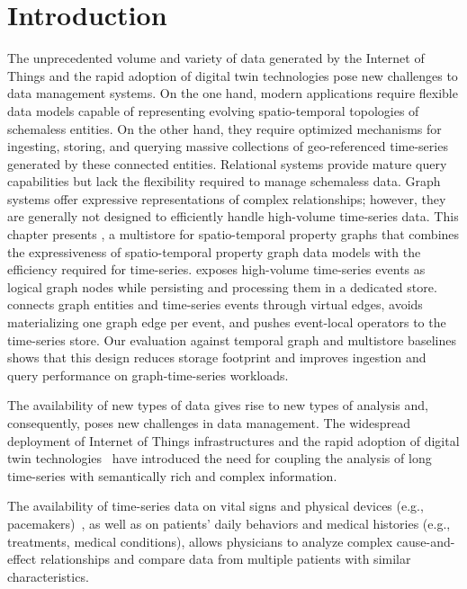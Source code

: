 \section{Introduction}

\label{sec:stgraph_paper}
The unprecedented volume and variety of data generated by the Internet of Things and the rapid adoption of digital twin technologies pose new challenges to data management systems.
On the one hand, modern applications require flexible data models capable of representing evolving spatio-temporal topologies of schemaless entities.
On the other hand, they require optimized mechanisms for ingesting, storing, and querying massive collections of geo-referenced time-series generated by these connected entities.
Relational systems provide mature query capabilities but lack the flexibility required to manage schemaless data.
Graph systems offer expressive representations of complex relationships; however, they are generally not designed to efficiently handle high-volume time-series data.
This chapter presents \ourapproach, a multistore for spatio-temporal property graphs that combines the expressiveness of spatio-temporal property graph data models with the efficiency required for time-series.
\ourapproach exposes high-volume time-series events as logical graph nodes while persisting and processing them in a dedicated store.
\ourapproach connects graph entities and time-series events through virtual edges, avoids materializing one graph edge per event, and pushes event-local operators to the time-series store.
Our evaluation against temporal graph and multistore baselines shows that this design reduces storage footprint and improves ingestion and query performance on graph-time-series workloads.


The availability of new types of data gives rise to new types of analysis and, consequently, poses new challenges in data management.
The widespread deployment of Internet of Things infrastructures and the rapid adoption of digital twin technologies~\cite{DBLP:journals/cacm/SakrBVIAAAABBDV21} have introduced the need for coupling the analysis of long time-series with semantically rich and complex information.

\begin{example}[Healthcare]
The availability of time-series data on vital signs and physical devices (e.g., pacemakers)~\cite{montagna2020real}, as well as on patients' daily behaviors and medical histories (e.g., treatments, medical conditions), allows physicians to analyze complex cause-and-effect relationships and compare data from multiple patients with similar characteristics.
\end{example}

